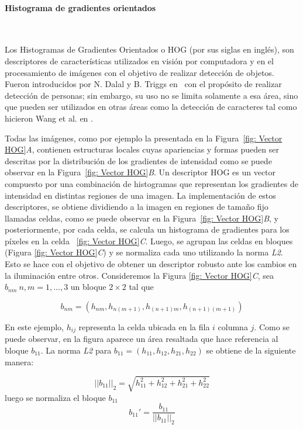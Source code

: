 \paragraph{Histograma de gradientes orientados} ~\\
\label{subsection:hog}

	Los Histogramas de Gradientes Orientados o HOG (por sus siglas en inglés), son descriptores de características utilizados en visión por computadora y en el procesamiento de imágenes con el objetivo de realizar detección de objetos. Fueron introducidos por N. Dalal y B. Triggs en~\cite{DT05} con el propósito de realizar detección de personas; sin embargo, su uso no se limita solamente a esa área, sino que pueden ser utilizados en otras áreas como la detección de caracteres tal como hicieron Wang et al. en \cite{wang}.
	
	Todas las imágenes, como por ejemplo la presentada en la Figura~\ref{fig: Vector HOG}\textit{A}, contienen estructuras locales cuyas apariencias y formas pueden ser descritas por la distribución de los gradientes de intensidad como se puede observar en la Figura~\ref{fig: Vector HOG}\textit{B}.
	Un descriptor HOG es un vector compuesto por una combinación de histogramas que representan los gradientes de intensidad en distintas regiones de una imagen. La implementación de estos descriptores, se obtiene dividiendo a la imagen en regiones de tamaño fijo llamadas celdas, como se puede observar en la Figura~\ref{fig: Vector HOG}\textit{B}, y posteriormente, por cada celda, se calcula un histograma de gradientes para los píxeles en la celda ~\ref{fig: Vector HOG}\textit{C}.
	Luego, se agrupan las celdas en bloques (Figura \ref{fig: Vector HOG}\textit{C}) y se normaliza cada uno utilizando la norma \textit{L2}. Esto se hace con el objetivo de obtener un descriptor robusto ante los cambios en la iluminación entre otros. Consideremos la Figura \ref{fig: Vector HOG}\textit{C}, sea $b_{nm}~n,m=1,\dots,3$ un bloque $2 \times 2$ tal que 
	
	$$b_{nm} = (h_{nm}, h_{n(m+1)}, h_{(n+1)m}, h_{(n+1)(m+1)})$$
	
	En este ejemplo, $h_{ij}$ representa la celda ubicada en la fila $i$ columna $j$. Como se puede observar, en la figura aparece un área resaltada que hace referencia al bloque $b_{11}$. La norma \textit{L2} para $b_{11} = (h_{11}, h_{12}, h_{21}, h_{22})$ se obtiene de la siguiente manera:
	
	 $$||b_{11}||_2 = \sqrt{h_{11}^{2} + h_{12}^{2} + h_{21}^{2} + h_{22}^{2}}$$
	 luego se normaliza el bloque $b_{11}$ 
     $$b_{11}' = \frac{b_{11}}{||b_{11}||_2} $$
     
